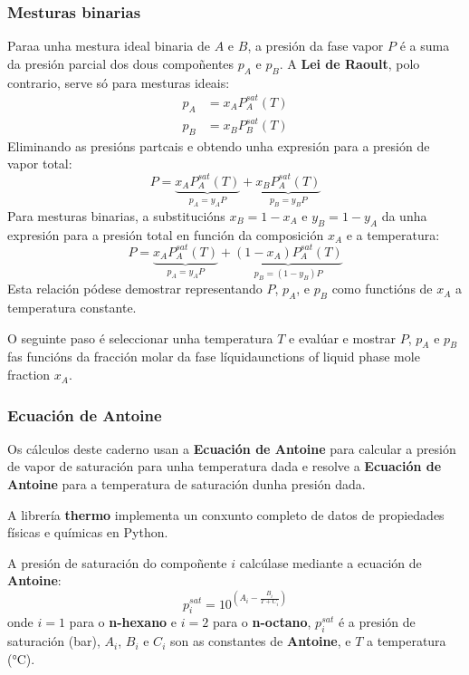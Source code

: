 \documentclass[
  letterpaper,
  DIV=11,
  numbers=noendperiod]{scrartcl}
\begin{document}
\subsubsection{Mesturas binarias}\label{mesturas-binarias}

Paraa unha mestura ideal binaria de \(A\) e \(B\), a presión da fase
vapor \(P\) é a suma da presión parcial dos dous compoñentes \(p_A\) e
\(p_B\). A \textbf{Lei de Raoult}, polo contrario, serve só para
mesturas ideais: \[
\begin{align*}
p_A & = x_A P^{sat}_A(T) \\
p_B & = x_B P^{sat}_B(T)
\end{align*}
\] Eliminando as presións partcais e obtendo unha expresión para a
presión de vapor total: \[
P = \underbrace{x_A P_A^{sat}(T)}_{p_A = y_AP} + \underbrace{x_B P_A^{sat}(T)}_{p_B = y_BP}
\] Para mesturas binarias, a substitucións \(x_B = 1-x_A\) e
\(y_B = 1 - y_A\) da unha expresión para a presión total en función da
composición \(x_A\) e a temperatura: \[
P = \underbrace{x_A P_A^{sat}(T)}_{p_A = y_AP}+ \underbrace{(1-x_A) P_A^{sat}(T)}_{p_B=(1-y_B)P}
\] Esta relación pódese demostrar representando \(P\), \(p_A\), e
\(p_B\) como functións de \(x_A\) a temperatura constante.

O seguinte paso é seleccionar unha temperatura \(T\) e evalúar e mostrar
\(P\), \(p_A\) e \(p_B\) fas funcións da fracción molar da fase
líquidaunctions of liquid phase mole fraction \(x_A\).

\subsubsection{Ecuación de Antoine}\label{ecuaciuxf3n-de-antoine}

Os cálculos deste caderno usan a \textbf{Ecuación de Antoine} para
calcular a presión de vapor de saturación para unha temperatura dada e
resolve a \textbf{Ecuación de Antoine} para a temperatura de saturación
dunha presión dada.

A librería \textbf{thermo} implementa un conxunto completo de datos de
propiedades físicas e químicas en Python.

A presión de saturación do compoñente \(i\) calcúlase mediante a
ecuación de \textbf{Antoine}: \[
p_i^{sat} = 10^ \left ( A_i - \frac {B_i} {T+C_i} \right )
\] onde \(i=1\) para o \textbf{n-hexano} e \(i=2\) para o
\textbf{n-octano}, \(p_i^{sat}\) é a presión de saturación (bar),
\(A_i\), \(B_i\) e \(C_i\) son as constantes de \textbf{Antoine}, e
\(T\) a temperatura (°C).
\end{document}
